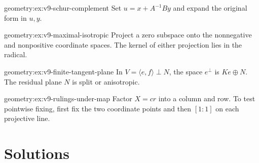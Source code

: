 \begin{hint}{geometry:ex:v9-schur-complement}
Set $u=x+A^{-1}By$ and expand the original form in $u,y$.
\end{hint}
\begin{hint}{geometry:ex:v9-maximal-isotropic}
Project a zero subspace onto the nonnegative and nonpositive coordinate
spaces. The kernel of either projection lies in the radical.
\end{hint}
\begin{hint}{geometry:ex:v9-finite-tangent-plane}
In $V=\langle e,f\rangle\perp N$, the space $e^\perp$ is $Ke\oplus N$.
The residual plane $N$ is split or anisotropic.
\end{hint}
\begin{hint}{geometry:ex:v9-rulings-under-map}
Factor $X=cr$ into a column and row. To test pointwise fixing, first
fix the two coordinate points and then $[1:1]$ on each projective line.
\end{hint}

\section{Solutions}

